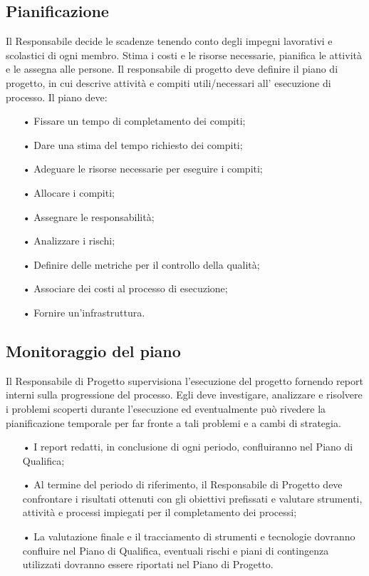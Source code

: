\subsection{Pianificazione}
Il Responsabile decide le scadenze tenendo conto degli impegni lavorativi e scolastici di ogni membro. Stima i costi e le risorse necessarie, pianifica le attività e le assegna alle persone. 
\newline
Il responsabile di progetto deve definire il piano di progetto, in cui descrive attività e compiti utili/necessari all’ esecuzione di processo.  
\newline
Il piano deve:
\begin{itemize}
\item[•] Fissare un tempo di completamento dei compiti;
\item[•] Dare una stima del tempo richiesto dei compiti;
\item[•] Adeguare le risorse necessarie per eseguire i compiti;
\item[•] Allocare i compiti;
\item[•] Assegnare le responsabilità; 
\item[•] Analizzare i rischi;
\item[•] Definire delle metriche per il controllo della qualità;
\item[•] Associare dei costi al processo di esecuzione;
\item[•] Fornire un’infrastruttura.
\end{itemize}

\subsection{Monitoraggio del piano}
Il Responsabile di Progetto supervisiona l'esecuzione del progetto fornendo report interni sulla progressione del processo. 
\newline
Egli deve investigare, analizzare e risolvere i problemi scoperti durante l'esecuzione ed eventualmente può rivedere la pianificazione temporale per far fronte a tali problemi e a cambi di strategia.
\begin{itemize}
\item[•] I report redatti, in conclusione di ogni periodo, confluiranno nel Piano di Qualifica;
\item[•] Al termine del periodo di riferimento, il Responsabile di Progetto deve confrontare i risultati ottenuti con gli obiettivi prefissati e valutare strumenti, attività e processi impiegati per il completamento dei processi;
\item[•] La valutazione finale e il tracciamento di strumenti e tecnologie dovranno confluire nel Piano di Qualifica, eventuali rischi e piani di contingenza utilizzati dovranno essere riportati nel Piano di Progetto.
\end{itemize}

